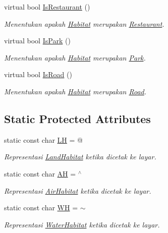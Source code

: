 \begin{DoxyCompactItemize}
virtual bool \hyperlink{classHabitat_a0ab72de6d88706b4eb693ea2a2c7de53}{Is\+Restaurant} ()
\begin{DoxyCompactList}\small\item\em Menentukan apakah \hyperlink{classHabitat}{Habitat} merupakan \hyperlink{classRestaurant}{Restaurant}. \end{DoxyCompactList}\item 
virtual bool \hyperlink{classHabitat_aa4cd06885065d8b7e3c4477c626d2fe7}{Is\+Park} ()
\begin{DoxyCompactList}\small\item\em Menentukan apakah \hyperlink{classHabitat}{Habitat} merupakan \hyperlink{classPark}{Park}. \end{DoxyCompactList}\item 
virtual bool \hyperlink{classHabitat_aafd95775cc1e0876b40955c3e0126fe3}{Is\+Road} ()
\begin{DoxyCompactList}\small\item\em Menentukan apakah \hyperlink{classHabitat}{Habitat} merupakan \hyperlink{classRoad}{Road}. \end{DoxyCompactList}\end{DoxyCompactItemize}
\subsection*{Static Protected Attributes}
\begin{DoxyCompactItemize}
\item 
static const char \hyperlink{classHabitat_a87fbedb46cde325396e3ef39350e14d7}{LH} = \textquotesingle{}@\textquotesingle{}
\begin{DoxyCompactList}\small\item\em Representasi \hyperlink{classLandHabitat}{Land\+Habitat} ketika dicetak ke layar. \end{DoxyCompactList}\item 
static const char \hyperlink{classHabitat_af5c4388fa9d305995799c61cc6f5231d}{AH} = \textquotesingle{}$^\wedge$\textquotesingle{}
\begin{DoxyCompactList}\small\item\em Representasi \hyperlink{classAirHabitat}{Air\+Habitat} ketika dicetak ke layar. \end{DoxyCompactList}\item 
static const char \hyperlink{classHabitat_aeba269066b13b0f7b632526af4d547d3}{WH} = \textquotesingle{}$\sim$\textquotesingle{}
\begin{DoxyCompactList}\small\item\em Representasi \hyperlink{classWaterHabitat}{Water\+Habitat} ketika dicetak ke layar. \end{DoxyCompactList}\end{DoxyCompactItemize}


